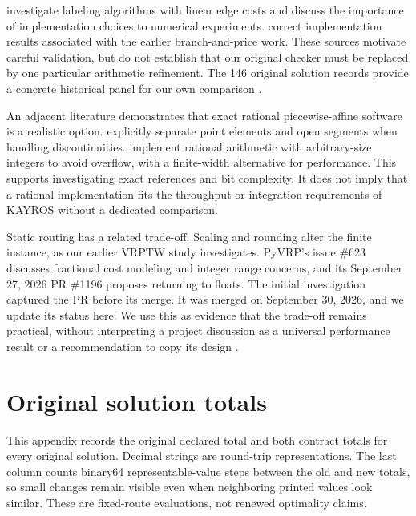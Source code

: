 \textcite{lera-romeroLinearEdgeCosts2020} investigate labeling algorithms with linear edge costs and discuss the importance of implementation choices to numerical experiments. \textcite{dabiaErratumBranchPrice2024} correct implementation results associated with the earlier branch-and-price work. These sources motivate careful validation, but do not establish that our original checker must be replaced by one particular arithmetic refinement. The 146 original solution records provide a concrete historical panel for our own comparison \autocite{dabiaBranchPriceTimeDependent2013}.

An adjacent literature demonstrates that exact rational piecewise-affine software is a realistic option. \textcite{zippoPseudoInverseComposition2023} explicitly separate point elements and open segments when handling discontinuities. \textcite{zippoNancy2022} implement rational arithmetic with arbitrary-size integers to avoid overflow, with a finite-width alternative for performance. This supports investigating exact references and bit complexity. It does not imply that a rational implementation fits the throughput or integration requirements of KAYROS without a dedicated comparison.

Static routing has a related trade-off. Scaling and rounding alter the finite instance, as our earlier VRPTW study investigates. PyVRP's issue \#623 discusses fractional cost modeling and integer range concerns, and its September 27, 2026 PR \#1196 proposes returning to floats. The initial investigation captured the PR before its merge. It was merged on September 30, 2026, and we update its status here. We use this as evidence that the trade-off remains practical, without interpreting a project discussion as a universal performance result or a recommendation to copy its design \autocite{rascoussierImpactScalingRounding2026,woudaDoubles2024,woudaFloats2026}.


\section{Original solution totals}\label{app:originals}

This appendix records the original declared total and both contract totals for every original solution. Decimal strings are round-trip representations. The last column counts binary64 representable-value steps between the old and new totals, so small changes remain visible even when neighboring printed values look similar. These are fixed-route evaluations, not renewed optimality claims.

